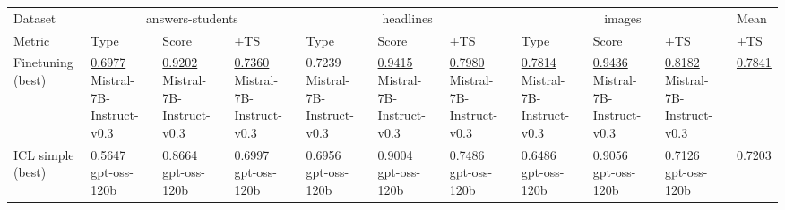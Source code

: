 \begin{table}[t]
\centering
\scriptsize
\setlength{\tabcolsep}{3pt}
\begin{adjustbox}{width=\textwidth}
\begin{tabular}{lllllllllll}
\toprule
Dataset & \multicolumn{3}{c}{answers-students} & \multicolumn{3}{c}{headlines} & \multicolumn{3}{c}{images} & Mean \\
Metric & Type & Score & +TS & Type & Score & +TS & Type & Score & +TS & +TS \\
\midrule
Finetuning (best) & \shortstack{\underline{0.6977}\\{\scriptsize Mistral-7B-Instruct-v0.3}} & \shortstack{\underline{0.9202}\\{\scriptsize Mistral-7B-Instruct-v0.3}} & \shortstack{\underline{0.7360}\\{\scriptsize Mistral-7B-Instruct-v0.3}} & \shortstack{0.7239\\{\scriptsize Mistral-7B-Instruct-v0.3}} & \shortstack{\underline{0.9415}\\{\scriptsize Mistral-7B-Instruct-v0.3}} & \shortstack{\underline{0.7980}\\{\scriptsize Mistral-7B-Instruct-v0.3}} & \shortstack{\underline{0.7814}\\{\scriptsize Mistral-7B-Instruct-v0.3}} & \shortstack{\underline{0.9436}\\{\scriptsize Mistral-7B-Instruct-v0.3}} & \shortstack{\underline{0.8182}\\{\scriptsize Mistral-7B-Instruct-v0.3}} & \shortstack{\underline{0.7841}\\{\scriptsize }} \\
\hline
ICL simple (best) & \shortstack{0.5647\\{\scriptsize gpt-oss-120b}} & \shortstack{0.8664\\{\scriptsize gpt-oss-120b}} & \shortstack{0.6997\\{\scriptsize gpt-oss-120b}} & \shortstack{0.6956\\{\scriptsize gpt-oss-120b}} & \shortstack{0.9004\\{\scriptsize gpt-oss-120b}} & \shortstack{0.7486\\{\scriptsize gpt-oss-120b}} & \shortstack{0.6486\\{\scriptsize gpt-oss-120b}} & \shortstack{0.9056\\{\scriptsize gpt-oss-120b}} & \shortstack{0.7126\\{\scriptsize gpt-oss-120b}} & \shortstack{0.7203\\{\scriptsize }} \\

\end{tabular}
\end{adjustbox}
\end{table}
